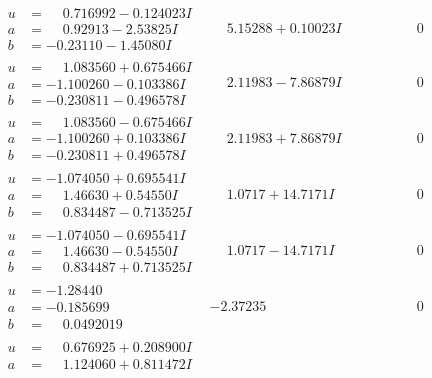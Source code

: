\documentclass[1p]{elsarticle_modified}
\theoremstyle{definition}
\begin{document}
$$\begin{array}{c|c|c}
 \hline 
\begin{aligned}
u &= \phantom{-}0.716992 - 0.124023 I \\
a &= \phantom{-}0.92913 - 2.53825 I \\
b &= -0.23110 - 1.45080 I\end{aligned}
 & \phantom{-}5.15288 + 0.10023 I & \phantom{-0.000000 } 0 \\ \hline\begin{aligned}
u &= \phantom{-}1.083560 + 0.675466 I \\
a &= -1.100260 - 0.103386 I \\
b &= -0.230811 - 0.496578 I\end{aligned}
 & \phantom{-}2.11983 - 7.86879 I & \phantom{-0.000000 } 0 \\ \hline\begin{aligned}
u &= \phantom{-}1.083560 - 0.675466 I \\
a &= -1.100260 + 0.103386 I \\
b &= -0.230811 + 0.496578 I\end{aligned}
 & \phantom{-}2.11983 + 7.86879 I & \phantom{-0.000000 } 0 \\ \hline\begin{aligned}
u &= -1.074050 + 0.695541 I \\
a &= \phantom{-}1.46630 + 0.54550 I \\
b &= \phantom{-}0.834487 - 0.713525 I\end{aligned}
 & \phantom{-}1.0717 + 14.7171 I & \phantom{-0.000000 } 0 \\ \hline\begin{aligned}
u &= -1.074050 - 0.695541 I \\
a &= \phantom{-}1.46630 - 0.54550 I \\
b &= \phantom{-}0.834487 + 0.713525 I\end{aligned}
 & \phantom{-}1.0717 - 14.7171 I & \phantom{-0.000000 } 0 \\ \hline\begin{aligned}
u &= -1.28440\phantom{ +0.000000I} \\
a &= -0.185699\phantom{ +0.000000I} \\
b &= \phantom{-}0.0492019\phantom{ +0.000000I}\end{aligned}
 & -2.37235\phantom{ +0.000000I} & \phantom{-0.000000 } 0 \\ \hline\begin{aligned}
u &= \phantom{-}0.676925 + 0.208900 I \\
a &= \phantom{-}1.124060 + 0.811472 I \\

\end{aligned}
\end{array}$$
\end{document}
